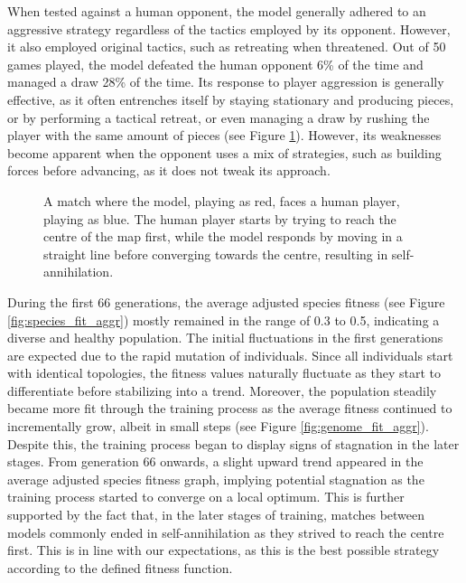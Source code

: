 \documentclass[letterpaper, 12pt]{article}
\begin{document}
When tested against a human opponent, the model generally adhered to an aggressive
strategy regardless of the tactics employed by its opponent. However, it also employed
original tactics, such as retreating when threatened. Out of 50 games played, the model
defeated the human opponent 6\% of the time and managed a draw 28\% of the time. Its
response to player aggression is generally effective, as it often entrenches itself by
staying stationary and producing pieces, or by performing a tactical retreat, or even
managing a draw by rushing the player with the same amount of pieces (see Figure
\ref{fig:player_aggr}). However, its weaknesses become apparent when the opponent uses a
mix of strategies, such as building forces before advancing, as it does not tweak its
approach.

\begin{figure}[H]
  \centering
  \caption{A match where the model, playing as red, faces a human player, playing
    as blue. The human player starts by trying to reach the centre of the map first, while
    the model responds by moving in a straight line before converging towards the centre,
    resulting in self-annihilation.
  }
  \label{fig:player_aggr}
\end{figure}

During the first 66 generations, the average adjusted species fitness (see Figure
\ref{fig:species_fit_aggr}) mostly remained in the range of 0.3 to 0.5, indicating a
diverse and healthy population. The initial fluctuations in the first generations are
expected due to the rapid mutation of individuals. Since all individuals start with
identical topologies, the fitness values naturally fluctuate as they start to
differentiate before stabilizing into a trend. Moreover, the population steadily became
more fit through the training process as the average fitness continued to incrementally
grow, albeit in small steps (see Figure \ref{fig:genome_fit_aggr}). Despite this, the
training process began to display signs of stagnation in the later stages. From
generation 66 onwards, a slight upward trend appeared in the average adjusted species
fitness graph, implying potential stagnation as the training process started to converge
on a local optimum. This is further supported by the fact that, in the later stages of
training, matches between models commonly ended in self-annihilation as they strived to
reach the centre first. This is in line with our expectations, as this is the best
possible strategy according to the defined fitness function.
\end{document}
